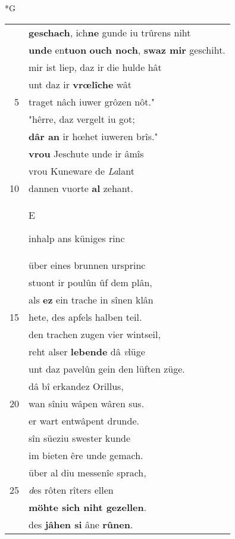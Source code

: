 \documentclass[8pt,a4paper,notitlepage]{article}
\begin{document}
\begin{table}[ht]
\begin{minipage}[t]{0.5\linewidth}
\small
\begin{center}*G
\end{center}
\begin{tabular}{rl}
 & \textbf{geschach}, ich\textbf{ne} gunde iu trûrens niht\\ 
 & \textbf{unde} en\textbf{tuon} \textbf{ouch noch}, \textbf{swaz mir} geschiht.\\ 
 & mir ist liep, daz ir die hulde hât\\ 
 & unt daz ir \textbf{vrœlîche} wât\\ 
5 & traget nâch iuwer grôzen nôt."\\ 
 & "hêrre, daz vergelt iu got;\\ 
 & \textbf{dâr an} ir hœhet iuweren brîs."\\ 
 & \textbf{vrou} Jeschute unde ir âmîs\\ 
 & vrou Kuneware de \textit{La}lant\\ 
10 & dannen vuorte \textbf{al} zehant.\\ 
 & \begin{large}E\end{large}inhalp ans küniges rinc\\ 
 & über eines brunnen ursprinc\\ 
 & stuont ir poulûn ûf dem plân,\\ 
 & als \textbf{ez} ein trache in sînen klân\\ 
15 & hete, des apfels halben teil.\\ 
 & den trachen zugen vier wintseil,\\ 
 & reht alser \textbf{lebende} dâ \textit{v}lüge\\ 
 & unt daz pavelûn gein den lüften züge.\\ 
 & dâ bî erkandez Orillus,\\ 
20 & wan sîniu wâpen wâren sus.\\ 
 & er wart entwâpent drunde.\\ 
 & sîn süeziu swester kunde\\ 
 & im bieten êre unde gemach.\\ 
 & über al diu messenîe sprach,\\ 
25 & \textit{d}es rôten rîters ellen\\ 
 & \textbf{möhte sich niht gezellen}.\\ 
 & des \textbf{jâhen si} âne \textbf{rûnen}.\\ 

\end{tabular}
\end{minipage}
\end{table}
\end{document}
